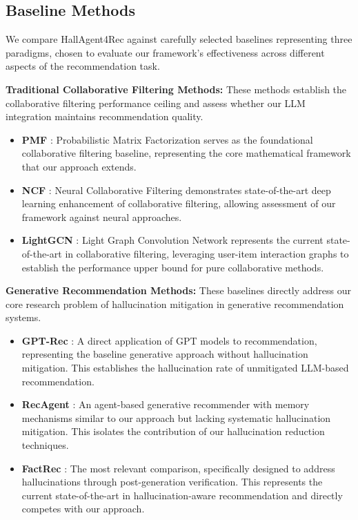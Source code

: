 \documentclass[acmsmall]{acmart}
\begin{document}
\subsection{Baseline Methods}
We compare HallAgent4Rec against carefully selected baselines representing three paradigms, chosen to evaluate our framework's effectiveness across different aspects of the recommendation task.

\textbf{Traditional Collaborative Filtering Methods:}
These methods establish the collaborative filtering performance ceiling and assess whether our LLM integration maintains recommendation quality.

\begin{itemize}
\item \textbf{PMF} \cite{mnih2007probabilistic}: Probabilistic Matrix Factorization serves as the foundational collaborative filtering baseline, representing the core mathematical framework that our approach extends.
\item \textbf{NCF} \cite{he2017neural}: Neural Collaborative Filtering demonstrates state-of-the-art deep learning enhancement of collaborative filtering, allowing assessment of our framework against neural approaches.
\item \textbf{LightGCN} \cite{he2020lightgcn}: Light Graph Convolution Network represents the current state-of-the-art in collaborative filtering, leveraging user-item interaction graphs to establish the performance upper bound for pure collaborative methods.
\end{itemize}

\textbf{Generative Recommendation Methods:}
These baselines directly address our core research problem of hallucination mitigation in generative recommendation systems.

\begin{itemize}
\item \textbf{GPT-Rec} \cite{kim2024gpt}: A direct application of GPT models to recommendation, representing the baseline generative approach without hallucination mitigation. This establishes the hallucination rate of unmitigated LLM-based recommendation.
\item \textbf{RecAgent} \cite{mitchell2024recagent}: An agent-based generative recommender with memory mechanisms similar to our approach but lacking systematic hallucination mitigation. This isolates the contribution of our hallucination reduction techniques.
\item \textbf{FactRec} \cite{li2024factrec}: The most relevant comparison, specifically designed to address hallucinations through post-generation verification. This represents the current state-of-the-art in hallucination-aware recommendation and directly competes with our approach.
\end{itemize}
\end{document}
